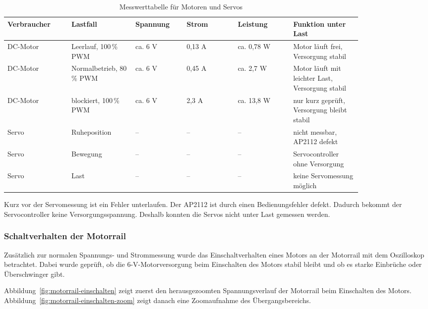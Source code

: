 \begin{table}[H]
	\centering
	\scriptsize
	\renewcommand{\arraystretch}{1.25}
	\setlength{\tabcolsep}{3pt}
	\begin{tabularx}{\linewidth}{L{0.15\linewidth}|L{0.15\linewidth}|L{0.12\linewidth}|L{0.12\linewidth}|L{0.13\linewidth}|L{0.16\linewidth}}
		\hline
		\textbf{Verbraucher} & \textbf{Lastfall} & \textbf{Spannung} & \textbf{Strom} & \textbf{Leistung} & \textbf{Funktion unter Last} \\\hline
		DC-Motor & Leerlauf, 100\,\% PWM & ca. 6 V & 0,13 A & ca. 0,78 W & Motor läuft frei, Versorgung stabil \\\hline
		DC-Motor & Normalbetrieb, 80\,\% PWM & ca. 6 V & 0,45 A & ca. 2,7 W & Motor läuft mit leichter Last, Versorgung stabil \\\hline
		DC-Motor & blockiert, 100\,\% PWM & ca. 6 V & 2,3 A & ca. 13,8 W & nur kurz geprüft, Versorgung bleibt stabil \\\hline
		Servo & Ruheposition & -- & -- & -- & nicht messbar, AP2112 defekt \\\hline
		Servo & Bewegung & -- & -- & -- & Servocontroller ohne Versorgung \\\hline
		Servo & Last & -- & -- & -- & keine Servomessung möglich \\\hline
	\end{tabularx}
	\caption{Messwerttabelle für Motoren und Servos}
	\label{tab:motor-servo-messwerte}
\end{table}

Kurz vor der Servomessung ist ein Fehler unterlaufen. Der AP2112 ist durch einen Bedienungsfehler defekt. Dadurch bekommt der Servocontroller keine Versorgungsspannung. Deshalb konnten die Servos nicht unter Last gemessen werden.



\subsubsection{Schaltverhalten der Motorrail}
Zusätzlich zur normalen Spannungs- und Strommessung wurde das Einschaltverhalten eines Motors an der Motorrail mit dem Oszilloskop betrachtet. Dabei wurde geprüft, ob die 6-V-Motorversorgung beim Einschalten des Motors stabil bleibt und ob es starke Einbrüche oder Überschwinger gibt.

Abbildung~\ref{fig:motorrail-einschalten} zeigt zuerst den herausgezoomten Spannungsverlauf der Motorrail beim Einschalten des Motors. Abbildung~\ref{fig:motorrail-einschalten-zoom} zeigt danach eine Zoomaufnahme des Übergangsbereichs.

